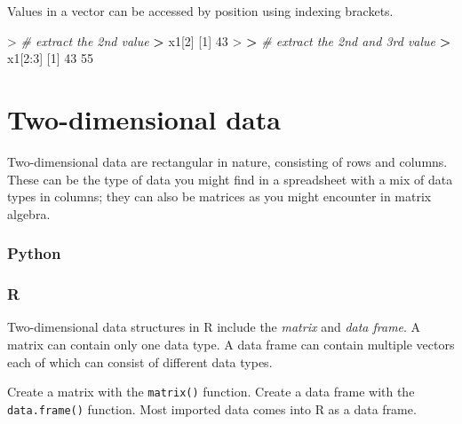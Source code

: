 \documentclass[
]{book}
\newenvironment{Shaded}{\begin{snugshade}}{\end{snugshade}}
\newcommand{\CommentTok}[1]{\textcolor[rgb]{0.56,0.35,0.01}{\textit{#1}}}
\newcommand{\DecValTok}[1]{\textcolor[rgb]{0.00,0.00,0.81}{#1}}
\newcommand{\ErrorTok}[1]{\textcolor[rgb]{0.64,0.00,0.00}{\textbf{#1}}}
\newcommand{\NormalTok}[1]{#1}
\newcommand{\SpecialCharTok}[1]{\textcolor[rgb]{0.00,0.00,0.00}{#1}}
\begin{document}
Values in a vector can be accessed by position using indexing brackets.

\begin{Shaded}
\begin{Highlighting}[]
\SpecialCharTok{\textgreater{}} \CommentTok{\# extract the 2nd value}
\ErrorTok{\textgreater{}}\NormalTok{ x1[}\DecValTok{2}\NormalTok{]}
\NormalTok{[}\DecValTok{1}\NormalTok{] }\DecValTok{43}
\SpecialCharTok{\textgreater{}} 
\ErrorTok{\textgreater{}} \CommentTok{\# extract the 2nd and 3rd value}
\ErrorTok{\textgreater{}}\NormalTok{ x1[}\DecValTok{2}\SpecialCharTok{:}\DecValTok{3}\NormalTok{]}
\NormalTok{[}\DecValTok{1}\NormalTok{] }\DecValTok{43} \DecValTok{55}
\end{Highlighting}
\end{Shaded}

\hypertarget{two-dimensional-data}{%
\section{Two-dimensional data}\label{two-dimensional-data}}

Two-dimensional data are rectangular in nature, consisting of rows and columns. These can be the type of data you might find in a spreadsheet with a mix of data types in columns; they can also be matrices as you might encounter in matrix algebra.

\hypertarget{python-8}{%
\subsubsection*{Python}\label{python-8}}

\hypertarget{r-8}{%
\subsubsection*{R}\label{r-8}}

Two-dimensional data structures in R include the \emph{matrix} and \emph{data frame}. A matrix can contain only one data type. A data frame can contain multiple vectors each of which can consist of different data types.

Create a matrix with the \texttt{matrix()} function. Create a data frame with the \texttt{data.frame()} function. Most imported data comes into R as a data frame.
\end{document}
